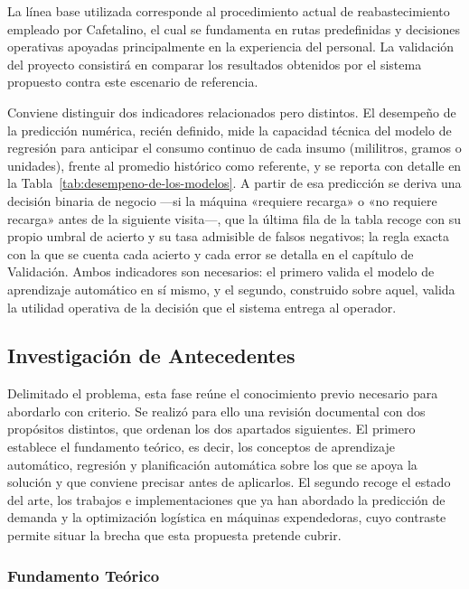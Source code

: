 La línea base utilizada corresponde al procedimiento actual de reabastecimiento empleado por Cafetalino, el cual se fundamenta en rutas predefinidas y decisiones operativas apoyadas principalmente en la experiencia del personal. La validación del proyecto consistirá en comparar los resultados obtenidos por el sistema propuesto contra este escenario de referencia.

Conviene distinguir dos indicadores relacionados pero distintos. El desempeño de la predicción numérica, recién definido, mide la capacidad técnica del modelo de regresión para anticipar el consumo continuo de cada insumo (mililitros, gramos o unidades), frente al promedio histórico como referente, y se reporta con detalle en la Tabla~\ref{tab:desempeno-de-los-modelos}. A partir de esa predicción se deriva una decisión binaria de negocio —si la máquina «requiere recarga» o «no requiere recarga» antes de la siguiente visita—, que la última fila de la tabla recoge con su propio umbral de acierto y su tasa admisible de falsos negativos; la regla exacta con la que se cuenta cada acierto y cada error se detalla en el capítulo de Validación. Ambos indicadores son necesarios: el primero valida el modelo de aprendizaje automático en sí mismo, y el segundo, construido sobre aquel, valida la utilidad operativa de la decisión que el sistema entrega al operador.

\subsection{Investigación de Antecedentes}\label{investigaciuxf3n-de-antecedentes}

Delimitado el problema, esta fase reúne el conocimiento previo necesario para abordarlo con criterio. Se realizó para ello una revisión documental con dos propósitos distintos, que ordenan los dos apartados siguientes. El primero establece el fundamento teórico, es decir, los conceptos de aprendizaje automático, regresión y planificación automática sobre los que se apoya la solución y que conviene precisar antes de aplicarlos. El segundo recoge el estado del arte, los trabajos e implementaciones que ya han abordado la predicción de demanda y la optimización logística en máquinas expendedoras, cuyo contraste permite situar la brecha que esta propuesta pretende cubrir.

\subsubsection{Fundamento Teórico}\label{fundamento-teuxf3rico}

